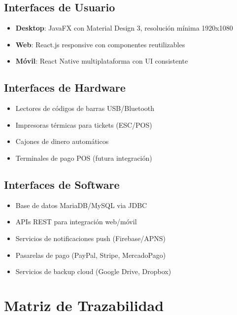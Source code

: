 \documentclass[12pt,letterpaper]{article}
\begin{document}
\subsection{Interfaces de Usuario}
\begin{itemize}
    \item \textbf{Desktop}: JavaFX con Material Design 3, resolución mínima 1920x1080
    \item \textbf{Web}: React.js responsive con componentes reutilizables
    \item \textbf{Móvil}: React Native multiplataforma con UI consistente
\end{itemize}

\subsection{Interfaces de Hardware}
\begin{itemize}
    \item Lectores de códigos de barras USB/Bluetooth
    \item Impresoras térmicas para tickets (ESC/POS)
    \item Cajones de dinero automáticos
    \item Terminales de pago POS (futura integración)
\end{itemize}

\subsection{Interfaces de Software}
\begin{itemize}
    \item Base de datos MariaDB/MySQL via JDBC
    \item APIs REST para integración web/móvil
    \item Servicios de notificaciones push (Firebase/APNS)
    \item Pasarelas de pago (PayPal, Stripe, MercadoPago)
    \item Servicios de backup cloud (Google Drive, Dropbox)
\end{itemize}

\section{Matriz de Trazabilidad}
\end{document}
